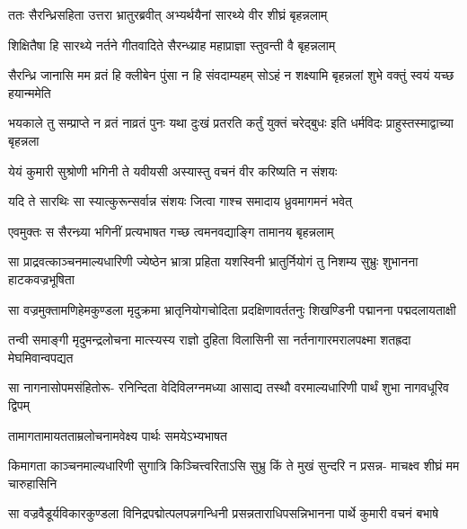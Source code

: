 
\twolineshloka
{ततः सैरन्ध्रिसहिता उत्तरा भ्रातुरब्रवीत्}
{अभ्यर्थयैनां सारथ्ये वीर शीघ्रं बृहन्नलाम्}


\twolineshloka
{शिक्षितैषा हि सारथ्ये नर्तने गीतवादिते}
{सैरन्ध्य्राह महाप्राज्ञा स्तुवन्ती वै बृहन्नलाम्}




\twolineshloka
{सैरन्ध्रि जानासि मम व्रतं हि क्लीबेन पुंसा न हि संवदाम्यहम्}
{सोऽहं न शक्ष्यामि बृहन्नलां शुभे वक्तुं स्वयं यच्छ हयान्ममेति}




\threelineshloka
{भयकाले तु सम्प्राप्ते न व्रतं नाव्रतं पुनः}
{यथा दुःखं प्रतरति कर्तुं युक्तं चरेद्बुधः}
{इति धर्मविदः प्राहुस्तस्माद्वाच्या बृहन्नला}


\twolineshloka
{येयं कुमारी सुश्रोणी भगिनी ते यवीयसी}
{अस्यास्तु वचनं वीर करिष्यति न संशयः}


\twolineshloka
{यदि ते सारथिः सा स्यात्कुरून्सर्वान्न संशयः}
{जित्वा गाश्च समादाय ध्रुवमागमनं भवेत्}



\twolineshloka
{एवमुक्तः स सैरन्ध्र्या भगिनीं प्रत्यभाषत}
{गच्छ त्वमनवद्याङ्गि तामानय बृहन्नलाम्}


\fourlineindentedshloka
{सा प्राद्रवत्काञ्चनमाल्यधारिणी}
{ज्येष्ठेन भ्रात्रा प्रहिता यशस्विनी}
{भ्रातुर्नियोगं तु निशम्य सुभ्रुः}
{शुभानना हाटकवज्रभूषिता}


\fourlineindentedshloka
{सा वज्रमुक्तामणिहेमकुण्डला}
{मृदुक्रमा भ्रातृनियोगचोदिता}
{प्रदक्षिणावर्ततनुः शिखण्डिनी}
{पद्मानना पद्मदलायताक्षी}


\fourlineindentedshloka
{तन्वी समाङ्गी मृदुमन्द्रलोचना}
{मात्स्यस्य राज्ञो दुहिता विलासिनी}
{सा नर्तनागारमरालपक्ष्मा}
{शतह्रदा मेघमिवान्वपद्यत}


\fourlineindentedshloka
{सा नागनासोपमसंहितोरू-}
{रनिन्दिता वेदिविलग्नमध्या}
{आसाद्य तस्थौ वरमाल्यधारिणी}
{पार्थं शुभा नागवधूरिव द्विपम्}


\onelineshloka
{तामागतामायतताम्रलोचनामवेक्ष्य पार्थः समयेऽभ्यभाषत}

\fourlineindentedshloka
{किमागता काञ्चनमाल्यधारिणी}
{सुगात्रि किञ्चित्त्वरिताऽसि सुभ्रु}
{किं ते मुखं सुन्दरि न प्रसन्न-}
{माचक्ष्व शीघ्रं मम चारुहासिनि}



\twolineshloka
{सा वज्रवैडूर्यविकारकुण्डला विनिद्रपद्मोत्पलपन्नगन्धिनी}
{प्रसन्नताराधिपसन्निभानना पार्थे कुमारी वचनं बभाषे}

